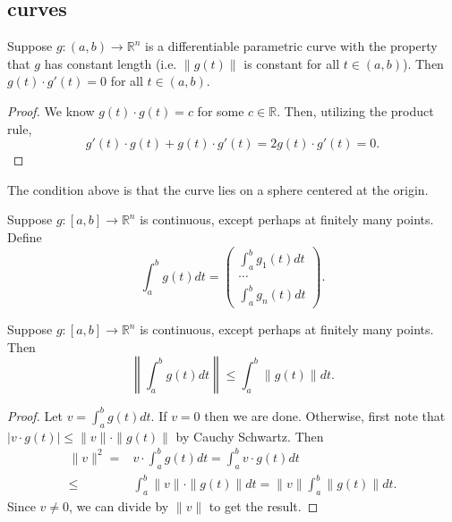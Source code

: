 \documentclass[12pt]{article}
\begin{document}
\subsection{curves} %

\begin{proposition}
	Suppose $g:(a,b)\to\mathbb{R}^n$ is a differentiable parametric curve with the property that $g$ has constant length (i.e. $\|g(t)\|$ is constant for all $t\in (a,b)$). Then $g(t)\cdot g'(t)=0$ for all $t\in (a,b)$.
\end{proposition}
\begin{proof} 
	We know $g(t)\cdot g(t)=c$ for some $c\in\mathbb{R}$. Then, utilizing the product rule,
	\begin{equation*}
		g'(t)\cdot g(t) + g(t)\cdot g'(t) = 2g(t)\cdot g'(t) = 0.
	\end{equation*}
\end{proof}	

\begin{remark}
	The condition above is that the curve lies on a sphere centered at the origin.
\end{remark}

\begin{definition}
	Suppose $g:[a,b]\to \mathbb{R}^n$ is continuous, except perhaps at finitely many points. Define 
	\begin{equation*}
		\int_a^b g(t)dt = \begin{pmatrix} \int_a^b g_1(t)dt \\ \cdots \\ \int_a^b g_n(t)dt \end{pmatrix}.
	\end{equation*}
\end{definition}

\begin{lemma}
	Suppose $g:[a,b]\to \mathbb{R}^n$ is continuous, except perhaps at finitely many points. Then 
	\begin{equation*}
		\left\|\int_a^b g(t)dt \right\| \leq \int_a^b \|g(t)\|dt.
	\end{equation*}
\end{lemma}
\begin{proof} 
	Let $v=\int_a^b g(t)dt$. If $v=0$ then we are done. Otherwise, first note that $|v\cdot g(t)|\leq\|v\|\cdot\|g(t)\|$ by Cauchy Schwartz. Then 
	\begin{align*}
		\|v\|^2 
		=& v\cdot \int_a^b g(t)dt = \int_a^b v\cdot g(t) dt \\
		\leq& \int_a^b \|v\|\cdot \|g(t)\|dt = \|v\|\int_a^b \|g(t)\|dt.
	\end{align*}
	Since $v\neq 0$, we can divide by $\|v\|$ to get the result.
\end{proof}	
\end{document}
